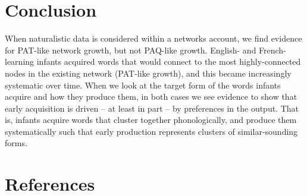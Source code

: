 \documentclass[
  man]{apa6}
\begin{document}
\hypertarget{conclusion}{%
\section{Conclusion}\label{conclusion}}

When naturalistic data is considered within a networks account, we find evidence for PAT-like network growth, but not PAQ-like growth. English- and French-learning infants acquired words that would connect to the most highly-connected nodes in the existing network (PAT-like growth), and this became increasingly systematic over time. When we look at the target form of the words infants acquire and how they produce them, in both cases we see evidence to show that early acquisition is driven -- at least in part -- by preferences in the output. That is, infants acquire words that cluster together phonologically, and produce them systematically such that early production represents clusters of similar-sounding forms.

\newpage

\hypertarget{references}{%
\section{References}\label{references}}

\begingroup
\setlength{\parindent}{-0.5in}
\setlength{\leftskip}{0.5in}
\end{document}
